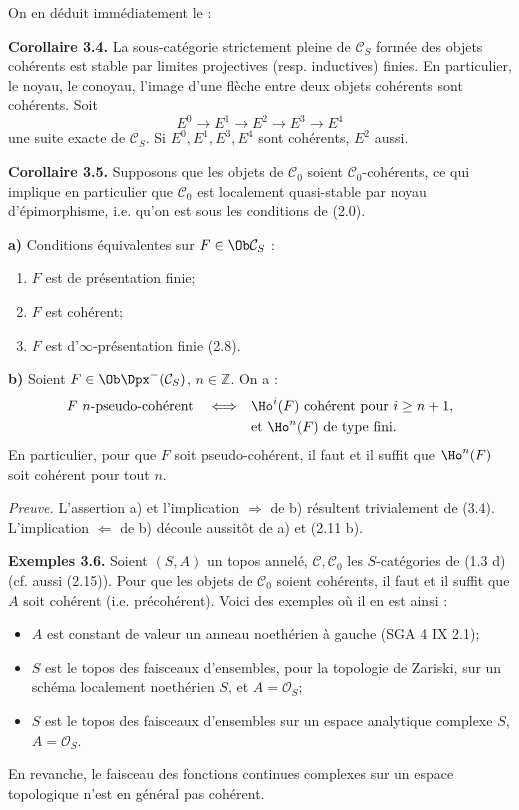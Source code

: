 \documentclass[11pt]{article}
\begin{document}
On en déduit immédiatement le :

\textbf{Corollaire 3.4.} La sous-catégorie strictement pleine de \(\mathcal C_S\) formée des objets cohérents est stable par limites projectives (resp. inductives) finies. En particulier, le noyau, le conoyau, l'image d'une flèche entre deux objets cohérents sont cohérents. Soit
\[
  E^0\longrightarrow E^1\longrightarrow E^2\longrightarrow E^3\longrightarrow E^4
\]
une suite exacte de \(\mathcal C_S\). Si \(E^0,E^1,E^3,E^4\) sont cohérents, \(E^2\) aussi.

\textbf{Corollaire 3.5.} Supposons que les objets de \(\mathcal C_0\) soient \(\mathcal C_0\)-cohérents, ce qui implique en particulier que \(\mathcal C_0\) est localement quasi-stable par noyau d'épimorphisme, i.e. qu'on est sous les conditions de (2.0).

\textbf{a)} Conditions équivalentes sur \(F\in\Ob\mathcal C_S\) :
\begin{enumerate}[label=(\roman*)]
\item \(F\) est de présentation finie;
\item \(F\) est cohérent;
\item \(F\) est d'\(\infty\)-présentation finie (2.8).
\end{enumerate}

\textbf{b)} Soient \(F\in\Ob\Dpx^-(\mathcal C_S)\), \(n\in\mathbb Z\). On a :
\[
\begin{split}
F\ n\text{-pseudo-cohérent}
\quad\Longleftrightarrow\quad&
\Ho^i(F)\text{ cohérent pour }i\geq n+1,\\
&\text{et }\Ho^n(F)\text{ de type fini.}
\end{split}
\]
En particulier, pour que \(F\) soit pseudo-cohérent, il faut et il suffit que \(\Ho^n(F)\) soit cohérent pour tout \(n\).

\emph{Preuve.} L'assertion a) et l'implication \(\Rightarrow\) de b) résultent trivialement de (3.4). L'implication \(\Leftarrow\) de b) découle aussitôt de a) et (2.11 b).

\textbf{Exemples 3.6.} Soient \((S,A)\) un topos annelé, \(\mathcal C,\mathcal C_0\) les \(S\)-catégories de (1.3 d) (cf. aussi (2.15)). Pour que les objets de \(\mathcal C_0\) soient cohérents, il faut et il suffit que \(A\) soit cohérent (i.e. précohérent). Voici des exemples où il en est ainsi :
\begin{itemize}
\item \(A\) est constant de valeur un anneau noethérien à gauche (SGA 4 IX 2.1);
\item \(S\) est le topos des faisceaux d'ensembles, pour la topologie de Zariski, sur un schéma localement noethérien \(S\), et \(A=\mathcal O_S\);
\item \(S\) est le topos des faisceaux d'ensembles sur un espace analytique complexe \(S\), \(A=\mathcal O_S\).
\end{itemize}
En revanche, le faisceau des fonctions continues complexes sur un espace topologique n'est en général pas cohérent.
\end{document}
